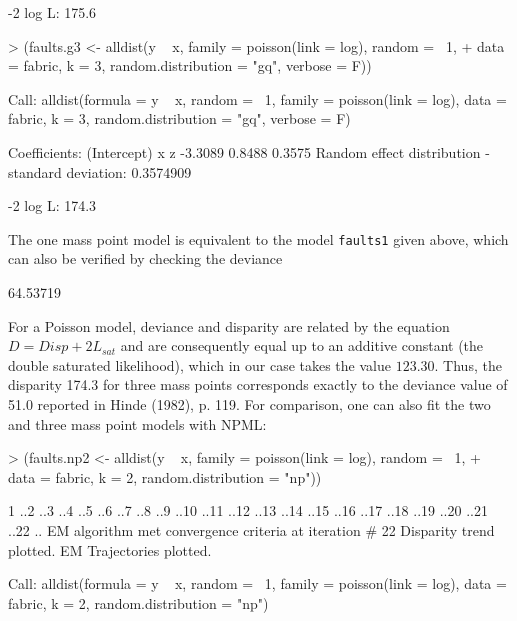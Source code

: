 \documentclass[a4paper]{article}
\begin{document}
\begin{landscape}
\begin{Schunk}
\begin{Soutput}
-2 log L:	    175.6 
\end{Soutput}
\begin{Sinput}
> (faults.g3 <- alldist(y ~ x, family = poisson(link = log), random = ~1, 
+     data = fabric, k = 3, random.distribution = "gq", verbose = F))
\end{Sinput}
\begin{Soutput}
Call:  alldist(formula = y ~ x, random = ~1, family = poisson(link = log),      data = fabric, k = 3, random.distribution = "gq", verbose = F) 

Coefficients:
(Intercept)            x            z  
    -3.3089       0.8488       0.3575  
Random effect distribution - standard deviation:	   0.3574909 

-2 log L:	    174.3 
\end{Soutput}
\end{Schunk}
The one mass point model is equivalent to the model {\tt faults1} given above, which can also be verified by checking the deviance
\begin{Schunk}
\begin{Soutput}
[1] 64.53719
\end{Soutput}
\end{Schunk}
For a Poisson model, deviance and disparity are related by the equation
$D=Disp +2L_{sat}$
and are consequently equal up to an additive constant (the double saturated likelihood), which in our case takes  the value $123.30$. Thus, the disparity 
 174.3 for three mass points corresponds exactly to the deviance value of 51.0 reported in Hinde (1982), p. 119. For comparison, one can also fit the two and three mass point models
 with NPML:
\begin{Schunk}
\begin{Sinput}
> (faults.np2 <- alldist(y ~ x, family = poisson(link = log), random = ~1, 
+     data = fabric, k = 2, random.distribution = "np"))
\end{Sinput}
\begin{Soutput}
1 ..2 ..3 ..4 ..5 ..6 ..7 ..8 ..9 ..10 ..11 ..12 ..13 ..14 ..15 ..16 ..17 ..18 ..19 ..20 ..21 ..22 ..
EM algorithm met convergence criteria at iteration #  22 
Disparity trend plotted.
EM Trajectories plotted.

Call:  alldist(formula = y ~ x, random = ~1, family = poisson(link = log),      data = fabric, k = 2, random.distribution = "np") 


\end{Soutput}
\end{Schunk}
\end{landscape}
\end{document}
